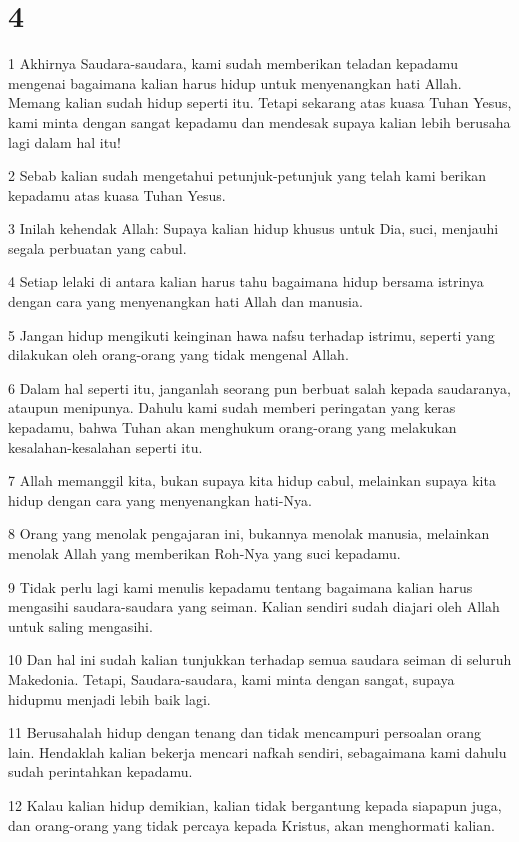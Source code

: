 \chapter{4}

\par 1 Akhirnya Saudara-saudara, kami sudah memberikan teladan kepadamu mengenai bagaimana kalian harus hidup untuk menyenangkan hati Allah. Memang kalian sudah hidup seperti itu. Tetapi sekarang atas kuasa Tuhan Yesus, kami minta dengan sangat kepadamu dan mendesak supaya kalian lebih berusaha lagi dalam hal itu!
\par 2 Sebab kalian sudah mengetahui petunjuk-petunjuk yang telah kami berikan kepadamu atas kuasa Tuhan Yesus.
\par 3 Inilah kehendak Allah: Supaya kalian hidup khusus untuk Dia, suci, menjauhi segala perbuatan yang cabul.
\par 4 Setiap lelaki di antara kalian harus tahu bagaimana hidup bersama istrinya dengan cara yang menyenangkan hati Allah dan manusia.
\par 5 Jangan hidup mengikuti keinginan hawa nafsu terhadap istrimu, seperti yang dilakukan oleh orang-orang yang tidak mengenal Allah.
\par 6 Dalam hal seperti itu, janganlah seorang pun berbuat salah kepada saudaranya, ataupun menipunya. Dahulu kami sudah memberi peringatan yang keras kepadamu, bahwa Tuhan akan menghukum orang-orang yang melakukan kesalahan-kesalahan seperti itu.
\par 7 Allah memanggil kita, bukan supaya kita hidup cabul, melainkan supaya kita hidup dengan cara yang menyenangkan hati-Nya.
\par 8 Orang yang menolak pengajaran ini, bukannya menolak manusia, melainkan menolak Allah yang memberikan Roh-Nya yang suci kepadamu.
\par 9 Tidak perlu lagi kami menulis kepadamu tentang bagaimana kalian harus mengasihi saudara-saudara yang seiman. Kalian sendiri sudah diajari oleh Allah untuk saling mengasihi.
\par 10 Dan hal ini sudah kalian tunjukkan terhadap semua saudara seiman di seluruh Makedonia. Tetapi, Saudara-saudara, kami minta dengan sangat, supaya hidupmu menjadi lebih baik lagi.
\par 11 Berusahalah hidup dengan tenang dan tidak mencampuri persoalan orang lain. Hendaklah kalian bekerja mencari nafkah sendiri, sebagaimana kami dahulu sudah perintahkan kepadamu.
\par 12 Kalau kalian hidup demikian, kalian tidak bergantung kepada siapapun juga, dan orang-orang yang tidak percaya kepada Kristus, akan menghormati kalian.
